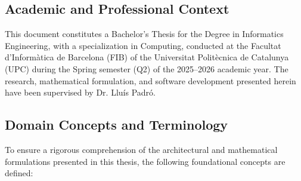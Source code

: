 \subsection{Academic and Professional Context}
\label{subsec:context}

This document constitutes a Bachelor's Thesis for the Degree in Informatics Engineering, with a specialization in Computing, conducted at the Facultat d'Informàtica de Barcelona (FIB) of the Universitat Politècnica de Catalunya (UPC) during the Spring semester (Q2) of the 2025--2026 academic year. The research, mathematical formulation, and software development presented herein have been supervised by Dr. Lluís Padró.

\subsection{Domain Concepts and Terminology}
\label{subsec:terms-and-concepts}

To ensure a rigorous comprehension of the architectural and mathematical formulations presented in this thesis, the following foundational concepts are defined:


